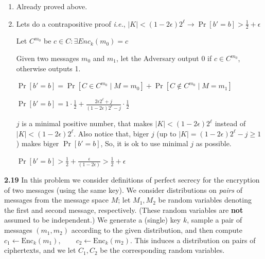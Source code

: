 \begin{enumerate}
    \item[(b)]  Already proved above.
    
    \item[(c)] Lets do a contrapositive proof \textit{i.e.}, $|K| < (1 - 2\epsilon)2^\ell \rightarrow \Pr[b' = b] > \frac{1}{2} + \epsilon$
    
    Let $C^{m_0}$ be $c \in C : \exists Enc_k(m_0) = c$
    
    Given two messages $m_0$ and $m_1$, let the Adversary output 0 if $c \in C^{m_0}$, otherwise outputs 1.
    
    $\Pr[b'=b] = \Pr[C \in C^{m_0} \mid M = m_0] + \Pr[C \not\in C^{m_0} \mid M = m_1]$
    
    $\Pr[b'=b] = 1 \cdot \frac{1}{2} + \frac{2\epsilon2^\ell + j}{(1 - 2\epsilon)2^\ell - j}  \cdot \frac{1}{2}$
    
    $j$ is a minimal positive number, that makes $|K| < (1 - 2\epsilon)2^\ell$ instead of $|K| < (1 - 2\epsilon)2^\ell$. Also notice that, biger $j$ (up to $|K| = (1 - 2\epsilon)2^\ell - j \ge 1$) makes  biger  $\Pr[b'=b]$, So, it is ok to use minimal $j$ as possible.
    
    $\Pr[b'=b] > \frac{1}{2} + \frac{\epsilon}{(1 - 2\epsilon)} > \frac{1}{2} + \epsilon$
    
\end{enumerate}


\newpage
\noindent
\textbf{2.19} \hspace{1em} In this problem we consider definitions of perfect secrecy for the encryp\-tion of two messages (using the same key).  
We consider distributions on \emph{pairs} of messages from the message space $M$; let $M_1,M_2$ be random variables denoting the first and second message, respectively.  
(These random variables are \textbf{not} assumed to be independent.)  
We generate a (single) key $k$, sample a pair of messages $(m_1,m_2)$ according to the given distribution, and then compute $c_1 \gets \mathrm{Enc}_k(m_1), \qquad c_2 \gets \mathrm{Enc}_k(m_2).$
This induces a distribution on pairs of ciphertexts, and we let $C_1,C_2$ be the corresponding random variables.


